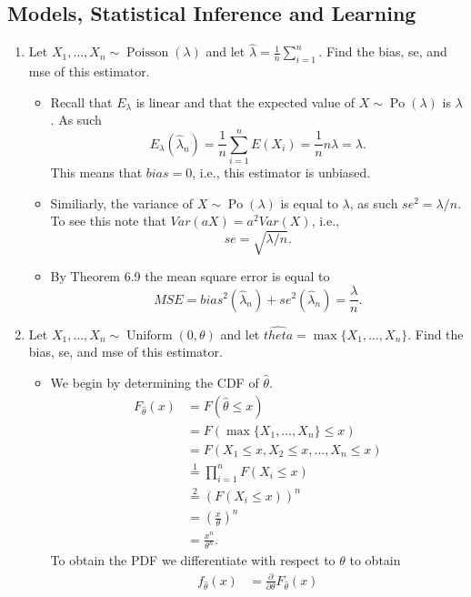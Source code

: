 \documentclass{article}
\begin{document}
\subsection{Models, Statistical Inference and Learning}
\begin{enumerate}
\item Let $X_1, \dots, X_n \sim \operatorname{Poisson}(\lambda)$ and let $\hat{\lambda} = \frac{1}{n} \sum_{i = 1}^n$. Find the bias, se, and mse of this estimator.
	\begin{itemize}
		\item Recall that $E_\lambda$ is linear and that the expected value of $X \sim \operatorname{Po}(\lambda)$ is $\lambda$. As such
		$$
		E_\lambda(\hat{\lambda}_n) = \frac{1}{n} \sum_{i = 1}^n E(X_i) = \frac{1}{n} n \lambda = \lambda.
		$$
		This means that $bias = 0$, i.e., this estimator is unbiased.
		\item Similiarly, the variance of $X \sim \operatorname{Po}(\lambda)$ is equal to $\lambda$, as such $se^2 = \lambda / n$. To see this note that $Var(aX) = a^2Var(X)$, i.e.,
		$$
		se = \sqrt{\lambda / n}.
		$$
		\item By Theorem 6.9 the mean square error is equal to
		$$
		MSE = bias^2(\hat{\lambda}_n) + se^2(\hat{\lambda}_n) = \frac{\lambda}{n}.
		$$
	\end{itemize}
\item Let $X_1, \dots, X_n \sim \operatorname{Uniform}(0, \theta)$ and let $\hat{theta} = \max\{X_1, \dots, X_n\}$. Find the bias, se, and mse of this estimator.
	\begin{itemize}
		\item We begin by determining the CDF of $\hat{\theta}$.
		$$
		\begin{aligned}
		F_{\hat{\theta}}(x) &= F(\hat{\theta} \leq x) \\ 
		&= F(\max\{X_1, \dots, X_n\} \leq x) \\
		&= F(X_1 \leq x, X_2 \leq x, \dots, X_n \leq x) \\
		&\overset{1}{=} \prod_{i = 1}^n F(X_i \leq x) \\
		&\overset{2}{=} (F(X_i \leq x))^n \\
		&= \left( \frac{x}{\theta} \right)^n \\
		&= \frac{x^n}{\theta^n}.
		\end{aligned}
		$$
		To obtain the PDF we differentiate with respect to $\theta$ to obtain
		$$
		\begin{aligned}
		f_{\hat{\theta}}(x) &= \frac{\partial}{\partial \theta} F_{\hat{\theta}}(x) \\

\end{aligned}$$
\end{itemize}
\end{enumerate}
\end{document}
